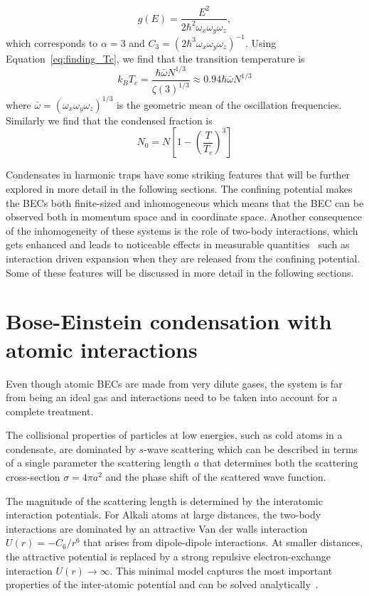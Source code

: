 \begin{equation}
	g(E)=\frac{E^2}{2\hbar^2\omega_x\omega_y\omega_z},
\end{equation}
%
which corresponds to $\alpha=3$ and $C_3=(2\hbar^3\omega_x\omega_y\omega_z)^{-1}$. Using Equation~\ref{eq:finding_Tc}, we find that the transition temperature is
%
\begin{equation}
 	k_B T_c=\frac{\hbar \bar{\omega}N^{1/3}}{\zeta(3)^{1/3}}\approx0.94\hbar\bar{\omega}N^{1/3}
 \end{equation} 
%
where $\bar{\omega}=(\omega_x\omega_y\omega_z)^{1/3}$ is the geometric mean of the oscillation frequencies. Similarly we find that the condensed fraction is
%
\begin{equation}
	N_0=N\left[1-\left(\frac{T}{T_c}\right)^3\right]
\end{equation}

Condensates in harmonic traps have some striking features that will be further explored in more detail in the following sections. The confining potential makes the BECs both finite-sized and inhomogeneous which means that the BEC can be observed both in momentum space and in coordinate space. Another consequence of the inhomogeneity of these systems is the role of two-body interactions, which gets enhanced and leads to noticeable effects in measurable quantities~\cite{dalfovo_theory_1999,castin_bose-einstein_1996} such as interaction driven expansion when they are released from the confining potential. Some of these features will be discussed in more detail in the following sections.

\section{Bose-Einstein condensation with atomic interactions}

Even though atomic BECs are made from very dilute gases, the system is far from being an ideal gas and interactions need to be taken into account for a complete treatment.%

The collisional properties of particles at low energies, such as cold atoms in a condensate, are dominated by $s$-wave scattering which can be described in terms of a single parameter the scattering length $a$ that determines both the scattering cross-section $\sigma=4\pi a^2$ and the phase shift of the scattered wave function. 

The magnitude of the scattering length is determined by the interatomic interaction potentials. For Alkali atoms at large distances, the two-body interactions are dominated by an attractive Van der walls interaction $U(r)=-C_6/r^6$ that arises from dipole-dipole interactions. At smaller distances, the attractive potential is replaced by a strong repulsive electron-exchange interaction $U(r)\rightarrow\infty$. This minimal model captures the most important properties of the inter-atomic potential and can be solved analytically~\cite{gribakin_calculation_1993}. 

